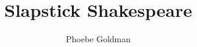\title{Slapstick Shakespeare}
\author{Phoebe Goldman}
\date{}

\newcommand{\theprof}{John Osburn}
\newcommand{\theclass}{History of Drama and Theater I}
